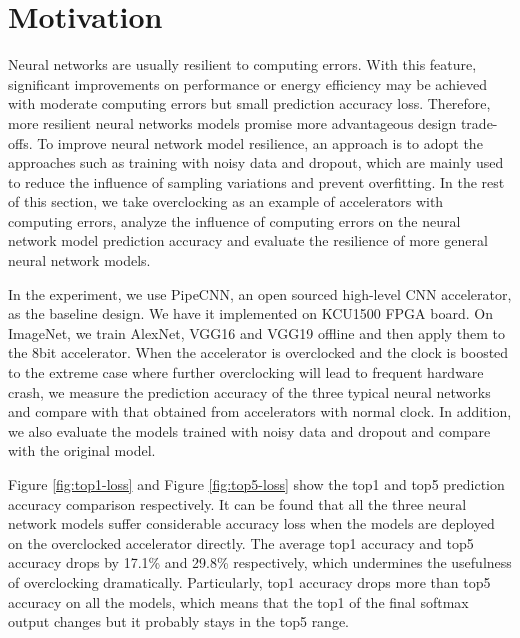 \section{Motivation} \label{sec:motivation}
Neural networks are usually resilient to computing errors. With this feature, 
significant improvements on performance or energy efficiency may be 
achieved with moderate computing errors but small prediction accuracy loss.
Therefore, more resilient neural networks models promise more advantageous 
design trade-offs. To improve neural network model resilience, an  approach is to adopt 
the approaches such as training with noisy data and dropout, which are mainly 
used to reduce the influence of sampling variations and prevent overfitting. 
In the rest of this section, we take overclocking as an example of accelerators 
with computing errors, analyze the influence of computing errors on 
the neural network model prediction accuracy and evaluate the resilience of 
more general neural network models.

In the experiment, we use PipeCNN\cite{pipecnn_2}, an open sourced high-level CNN accelerator, 
as the baseline design. We have it implemented on KCU1500 FPGA board. 
On ImageNet, we train AlexNet, VGG16 and VGG19 offline and then apply them to the 8bit accelerator. 
When the accelerator is overclocked and the clock is boosted to the extreme case where 
further overclocking will lead to frequent hardware crash, we measure the prediction accuracy of 
the three typical neural networks and compare with that obtained from accelerators with normal 
clock. In addition, we also evaluate the models trained with noisy data and dropout and 
compare with the original model.

Figure \ref{fig:top1-loss} and Figure \ref{fig:top5-loss} show the top1 and top5 prediction accuracy comparison 
respectively. It can be found that all the three neural network models suffer considerable accuracy loss 
when the models are deployed on the overclocked accelerator directly. The average top1 accuracy and top5 accuracy 
drops by 17.1\% and 29.8\% respectively, which undermines the usefulness of overclocking dramatically.
Particularly, top1 accuracy drops more than top5 accuracy on all the 
models, which means that the top1 of the final softmax output changes but it probably 
stays in the top5 range. 

